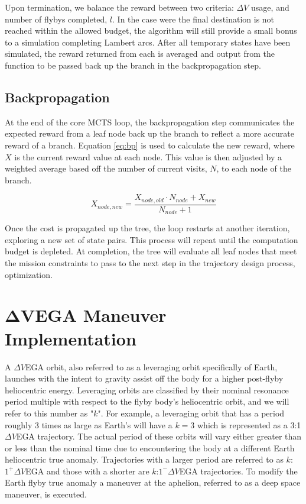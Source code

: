\documentclass[letterpaper, preprint, paper,11pt]{AAS}	%
\begin{document}
Upon termination, we balance the reward between two criteria: $\Delta V$ usage, and number of flybys completed, $l$. In the case were the final destination is not reached within the allowed budget, the algorithm will still provide a small bonus to a simulation completing Lambert arcs. After all temporary states have been simulated, the reward returned from each is averaged and output from the function to be passed back up the branch in the backpropagation step.

\subsection{Backpropagation}

At the end of the core MCTS loop, the backpropagation step communicates the expected reward from a leaf node back up the branch to reflect a more accurate reward of a branch. Equation \eqref{eq:bp} is used to calculate the new reward, where $X$ is the current reward value at each node. This value is then adjusted by a weighted average based off the number of current visits, $N$, to each node of the branch.

\begin{equation}
    \label{eq:bp}
    X_{node, new} = \frac{X_{node, old} \cdot N_{node} + X_{new}}{N_{node} + 1}
\end{equation}

Once the cost is propagated up the tree, the loop restarts at another iteration, exploring a new set of state pairs. This process will repeat until the computation budget is depleted. At completion, the tree will evaluate all leaf nodes that meet the mission constraints to pass to the next step in the trajectory design process, optimization.

\section*{$\boldsymbol{\Delta V}$EGA Maneuver Implementation}

A $\Delta V$EGA orbit, also referred to as a leveraging orbit specifically of Earth, launches with the intent to gravity assist off the body for a higher post-flyby heliocentric energy\cite{Hollenbeck}. Leveraging orbits are classified by their nominal resonance period multiple with respect to the flyby body's heliocentric orbit, and we will refer to this number as "$k$". For example, a leveraging orbit that has a period roughly 3 times as large as Earth's will have a $k=3$ which is represented as a 3:1 $\Delta V$EGA trajectory. The actual period of these orbits will vary either greater than or less than the nominal time due to encountering the body at a different Earth heliocentric true anomaly. Trajectories with a larger period are referred to as $k$:$1^{+} \Delta V$EGA and those with a shorter are $k$:$1^{-} \Delta V$EGA trajectories. To modify the Earth flyby true anomaly a maneuver at the aphelion, referred to as a deep space maneuver, is executed.
\end{document}
